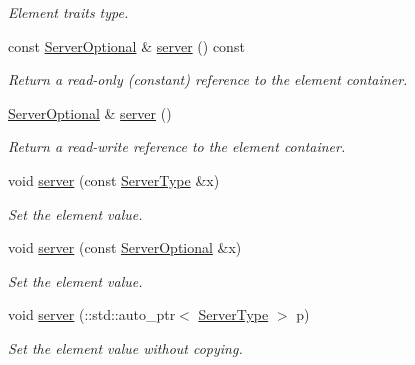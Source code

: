 \begin{DoxyCompactItemize}
\begin{DoxyCompactList}\small\item\em Element traits type. \item\end{DoxyCompactList}\item 
const \hyperlink{classopenstack_1_1xml_1_1SharedIpGroup_a869aa94acd2787b236dbd0f24ff4ea4d}{ServerOptional} \& \hyperlink{classopenstack_1_1xml_1_1SharedIpGroup_a63c0906cb78eff22bae096827e3fc9fa}{server} () const 
\begin{DoxyCompactList}\small\item\em Return a read-\/only (constant) reference to the element container. \item\end{DoxyCompactList}\item 
\hyperlink{classopenstack_1_1xml_1_1SharedIpGroup_a869aa94acd2787b236dbd0f24ff4ea4d}{ServerOptional} \& \hyperlink{classopenstack_1_1xml_1_1SharedIpGroup_a73517dac6885135604f5927570bb5eda}{server} ()
\begin{DoxyCompactList}\small\item\em Return a read-\/write reference to the element container. \item\end{DoxyCompactList}\item 
void \hyperlink{classopenstack_1_1xml_1_1SharedIpGroup_ad64472de6f44e6b85f6be3580f692fe8}{server} (const \hyperlink{classopenstack_1_1xml_1_1ServerID}{ServerType} \&x)
\begin{DoxyCompactList}\small\item\em Set the element value. \item\end{DoxyCompactList}\item 
void \hyperlink{classopenstack_1_1xml_1_1SharedIpGroup_adb737d7d06bc1d6ab4a2d4cc103f789a}{server} (const \hyperlink{classopenstack_1_1xml_1_1SharedIpGroup_a869aa94acd2787b236dbd0f24ff4ea4d}{ServerOptional} \&x)
\begin{DoxyCompactList}\small\item\em Set the element value. \item\end{DoxyCompactList}\item 
void \hyperlink{classopenstack_1_1xml_1_1SharedIpGroup_ad9d780d95b1798820db9b4b5326e6449}{server} (::std::auto\_\-ptr$<$ \hyperlink{classopenstack_1_1xml_1_1ServerID}{ServerType} $>$ p)
\begin{DoxyCompactList}\small\item\em Set the element value without copying. \item\end{DoxyCompactList}\end{DoxyCompactItemize}
